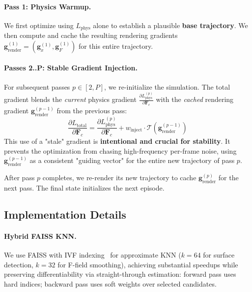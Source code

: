     \paragraph{Pass 1: Physics Warmup.}
    We first optimize using $L_{\text{phys}}$ alone to establish a plausible \textbf{base trajectory}. We then compute and cache the resulting rendering gradients $\mathbf{g}_{\text{render}}^{(1)} = (\mathbf{g}_x^{(1)}, \mathbf{g}_F^{(1)})$ for this entire trajectory.
    
    \paragraph{Passes 2..P: Stable Gradient Injection.}
    For subsequent passes $p \in [2, P]$, we re-initialize the simulation. The total gradient blends the \emph{current} physics gradient $\frac{\partial L_{\text{phys}}^{(p)}}{\partial \mathbf{F}_c}$ with the \emph{cached} rendering gradient $\mathbf{g}_{\text{render}}^{(p-1)}$ from the previous pass:
    $$
    \frac{\partial L_{\text{total}}}{\partial \mathbf{F}_c}
    = \frac{\partial L_{\text{phys}}^{(p)}}{\partial \mathbf{F}_c}
    + w_{\text{inject}} \cdot \mathcal{T}(\mathbf{g}_{\text{render}}^{(p-1)})
    $$
    This use of a "stale" gradient is \textbf{intentional and crucial for stability}. It prevents the optimization from chasing high-frequency per-frame noise, using $\mathbf{g}_{\text{render}}^{(p-1)}$ as a consistent "guiding vector" for the entire new trajectory of pass $p$. 
    
    After pass $p$ completes, we re-render its new trajectory to cache $\mathbf{g}_{\text{render}}^{(p)}$ for the next pass. The final state initializes the next episode.

\subsection{Implementation Details}
\label{sec:implementation}

\paragraph{Hybrid FAISS KNN.}
    We use FAISS with IVF indexing~\cite{johnson2017billionscalesimilaritysearchgpus, douze2025faisslibrary} for approximate KNN ($k=64$ for surface detection, $k=32$ for F-field smoothing), achieving substantial speedups while preserving differentiability via straight-through estimation: forward pass uses hard indices; backward pass uses soft weights over selected candidates.
    
